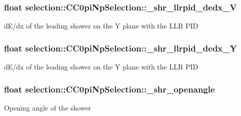 \subsubsection[{\texorpdfstring{\+\_\+shr\+\_\+llrpid\+\_\+dedx\+\_\+V}{_shr_llrpid_dedx_V}}]{\setlength{\rightskip}{0pt plus 5cm}float selection\+::\+C\+C0pi\+Np\+Selection\+::\+\_\+shr\+\_\+llrpid\+\_\+dedx\+\_\+V\hspace{0.3cm}{\ttfamily [private]}}\hypertarget{classselection_1_1CC0piNpSelection_af27b6e10cdab2cb2b5c07bfcf7a8e491}{}\label{classselection_1_1CC0piNpSelection_af27b6e10cdab2cb2b5c07bfcf7a8e491}
d\+E/dx of the leading shower on the Y plane with the L\+LR P\+ID 
\subsubsection[{\texorpdfstring{\+\_\+shr\+\_\+llrpid\+\_\+dedx\+\_\+Y}{_shr_llrpid_dedx_Y}}]{\setlength{\rightskip}{0pt plus 5cm}float selection\+::\+C\+C0pi\+Np\+Selection\+::\+\_\+shr\+\_\+llrpid\+\_\+dedx\+\_\+Y\hspace{0.3cm}{\ttfamily [private]}}\hypertarget{classselection_1_1CC0piNpSelection_a17acfa1b5d6a4d3f5c382c3f320fda83}{}\label{classselection_1_1CC0piNpSelection_a17acfa1b5d6a4d3f5c382c3f320fda83}
d\+E/dx of the leading shower on the Y plane with the L\+LR P\+ID 
\subsubsection[{\texorpdfstring{\+\_\+shr\+\_\+openangle}{_shr_openangle}}]{\setlength{\rightskip}{0pt plus 5cm}float selection\+::\+C\+C0pi\+Np\+Selection\+::\+\_\+shr\+\_\+openangle\hspace{0.3cm}{\ttfamily [private]}}\hypertarget{classselection_1_1CC0piNpSelection_a33b26acb3cdb05cb1b81800d8af48a03}{}\label{classselection_1_1CC0piNpSelection_a33b26acb3cdb05cb1b81800d8af48a03}
Opening angle of the shower 
